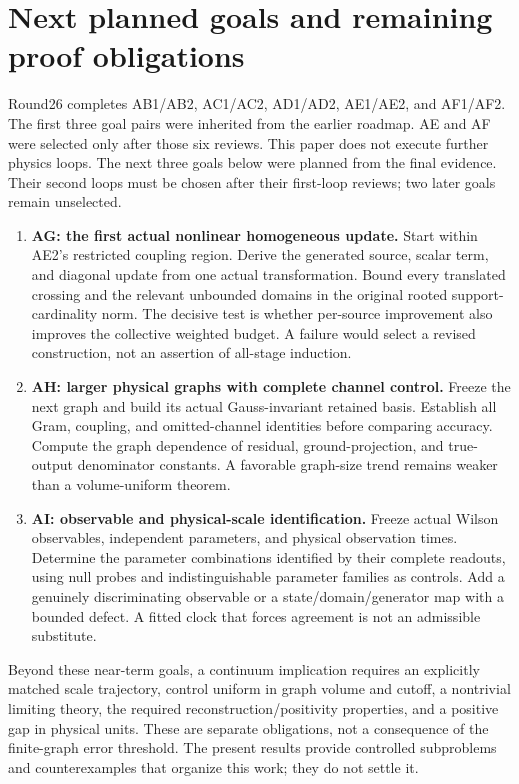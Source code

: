 \section{Next planned goals and remaining proof obligations}
\label{sec:roadmap}

Round26 completes AB1/AB2, AC1/AC2, AD1/AD2, AE1/AE2, and AF1/AF2. The first three goal pairs were inherited from the earlier roadmap. AE and AF were selected only after those six reviews. This paper does not execute further physics loops. The next three goals below were planned from the final evidence. Their second loops must be chosen after their first-loop reviews; two later goals remain unselected.

\begin{enumerate}
\item \textbf{AG: the first actual nonlinear homogeneous update.}
Start within AE2's restricted coupling region. Derive the generated source, scalar term, and diagonal update from one actual transformation. Bound every translated crossing and the relevant unbounded domains in the original rooted support-cardinality norm. The decisive test is whether per-source improvement also improves the collective weighted budget. A failure would select a revised construction, not an assertion of all-stage induction.
\item \textbf{AH: larger physical graphs with complete channel control.}
Freeze the next graph and build its actual Gauss-invariant retained basis. Establish all Gram, coupling, and omitted-channel identities before comparing accuracy. Compute the graph dependence of residual, ground-projection, and true-output denominator constants. A favorable graph-size trend remains weaker than a volume-uniform theorem.
\item \textbf{AI: observable and physical-scale identification.}
Freeze actual Wilson observables, independent parameters, and physical observation times. Determine the parameter combinations identified by their complete readouts, using null probes and indistinguishable parameter families as controls. Add a genuinely discriminating observable or a state/domain/generator map with a bounded defect. A fitted clock that forces agreement is not an admissible substitute.
\end{enumerate}

Beyond these near-term goals, a continuum implication requires an explicitly matched scale trajectory, control uniform in graph volume and cutoff, a nontrivial limiting theory, the required reconstruction/positivity properties, and a positive gap in physical units. These are separate obligations, not a consequence of the finite-graph error threshold. The present results provide controlled subproblems and counterexamples that organize this work; they do not settle it.

